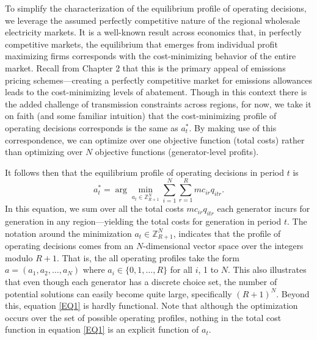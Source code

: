 To simplify the characterization of the equilibrium profile of operating decisions, we leverage the assumed perfectly competitive nature of the regional wholesale electricity markets. It is a well-known result across economics that, in perfectly competitive markets, the equilibrium that emerges from individual  profit maximizing firms corresponds with the cost-minimizing behavior of the entire market. Recall from Chapter 2 that this is the primary appeal of emissions pricing schemes---creating a perfectly competitive market for emissions allowances leads to the cost-minimizing levels of abatement. Though in this context there is the added challenge of transmission constraints across regions, for now, we take it on faith (and some familiar intuition) that the cost-minimizing profile of operating decisions corresponds is the same as $a_t^*$. By making use of this correspondence, we can optimize over one objective function (total costs) rather than optimizing over $N$ objective functions (generator-level profits). 

It follows then that the equilibrium profile of operating decisions in period $t$ is
\begin{equation}\label{EQ1}
    a_t^* = \arg\min_{a_t \in \mathbb{Z}_{R + 1}^N} \sum_{i = 1}^N \sum_{r = 1}^R mc_{ir} q_{itr}.
\end{equation}
In this equation, we sum over all the total costs $mc_{ir} q_{itr}$ each generator incurs for generation in any region---yielding the total costs for generation in period $t$. The notation around the minimization $a_t \in \mathbb{Z}_{R + 1}^N$, indicates that the profile of operating decisions comes from an $N$-dimensional vector space over the integers modulo $R +1$. That is, the all operating profiles take the form $a = (a_{1}, a_2, \ldots, a_N)$ where $a_i \in \{0, 1, \ldots, R\}$ for all $i$, 1 to $N$. This also illustrates that even though each generator has a discrete choice set, the number of potential solutions can easily become quite large, specifically $(R + 1)^N$. Beyond this, equation \eqref{EQ1} is hardly functional. Note that although the optimization occurs over the set of possible operating profiles, nothing in the total cost function in equation \eqref{EQ1} is an explicit function of $a_{t}$. 


